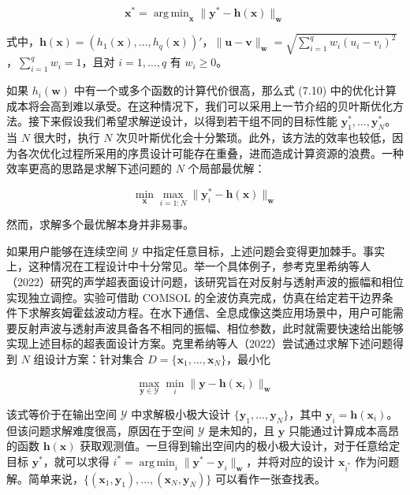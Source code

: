 \documentclass{ctexart}
\DeclareMathOperator*{\argmin}{arg\,min}
\begin{document}
\begin{equation*}
\boldsymbol x^*=\argmin_{\boldsymbol x}\|\boldsymbol y^*-\boldsymbol h(\boldsymbol x)\|_{\boldsymbol{w}}
\tag{7.10}
\end{equation*}

式中，$\boldsymbol h(\boldsymbol x)=(h_1(\boldsymbol x),\dots,h_q(\boldsymbol x))'$，$\|\boldsymbol u-\boldsymbol v\|_{\boldsymbol{w}}=\sqrt{\sum_{i=1}^{q}w_i(u_i-v_i)^2}$，$\sum_{i=1}^{q}w_i=1$，且对 $i=1,\dots,q$ 有 $w_i\ge 0$。

如果 $h_i(\boldsymbol{w})$ 中有一个或多个函数的计算代价很高，那么式 (7.10) 中的优化计算成本将会高到难以承受。在这种情况下，我们可以采用上一节介绍的贝叶斯优化方法。接下来假设我们希望求解逆设计，以得到若干组不同的目标性能 $\boldsymbol{y}^*_1,\dots,\boldsymbol{y}^*_N$。当 $N$ 很大时，执行 $N$ 次贝叶斯优化会十分繁琐。此外，该方法的效率也较低，因为各次优化过程所采用的序贯设计可能存在重叠，进而造成计算资源的浪费。一种效率更高的思路是求解下述问题的 $N$ 个局部最优解：

\begin{equation*}
\min_{\boldsymbol{x}}\max_{i=1:N}\|\boldsymbol{y}^*_i-\boldsymbol{h}(\boldsymbol{x})\|_{\boldsymbol{w}}
\end{equation*}

然而，求解多个最优解本身并非易事。

如果用户能够在连续空间 $\mathcal{Y}$ 中指定任意目标，上述问题会变得更加棘手。事实上，这种情况在工程设计中十分常见。举一个具体例子，参考克里希纳等人（2022）研究的声学超表面设计问题，该研究旨在对反射与透射声波的振幅和相位实现独立调控。实验可借助 COMSOL 的全波仿真完成，仿真在给定若干边界条件下求解亥姆霍兹波动方程。在水下通信、全息成像这类应用场景中，用户可能需要反射声波与透射声波具备各不相同的振幅、相位参数，此时就需要快速给出能够实现上述目标的超表面设计方案。克里希纳等人（2022）尝试通过求解下述问题得到 $N$ 组设计方案：针对集合 $D=\{\boldsymbol{x}_1,\dots,\boldsymbol{x}_N\}$，最小化

\begin{equation*}
\max_{\boldsymbol{y}\in\mathcal{Y}}\min_{i}\|\boldsymbol{y}-\boldsymbol{h}(\boldsymbol{x}_i)\|_{\boldsymbol{w}}
\tag{7.11}
\end{equation*}

该式等价于在输出空间 $\mathcal{Y}$ 中求解极小极大设计 $\{\boldsymbol{y}_1,\dots,\boldsymbol{y}_N\}$，其中 $\boldsymbol{y}_i=\boldsymbol{h}(\boldsymbol{x}_i)$。但该问题求解难度很高，原因在于空间 $\mathcal{Y}$ 是未知的，且 $\boldsymbol{y}$ 只能通过计算成本高昂的函数 $\boldsymbol{h}(\boldsymbol{x})$ 获取观测值。一旦得到输出空间内的极小极大设计，对于任意给定目标 $\boldsymbol{y}^*$，就可以求得 $i^*=\argmin_i\|\boldsymbol{y}^*-\boldsymbol{y}_i\|_{\boldsymbol{w}}$，并将对应的设计 $\boldsymbol{x}_{i^*}$ 作为问题解。简单来说，$\{(\boldsymbol{x}_1,\boldsymbol{y}_1),\dots,(\boldsymbol{x}_N,\boldsymbol{y}_N)\}$ 可以看作一张查找表。
\end{document}
